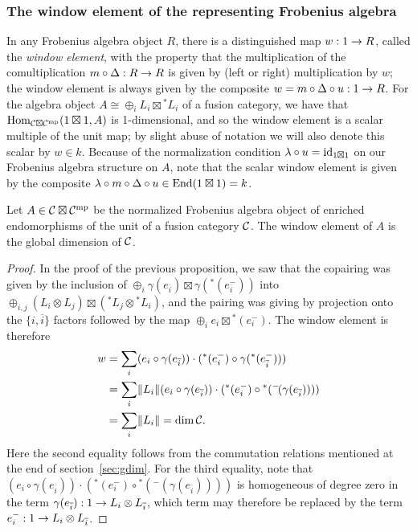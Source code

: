 \documentclass{amsart}
\begin{document}
\subsubsection{The window element of the representing Frobenius algebra}

In any Frobenius algebra object $R$, there is a distinguished map $w: 1 \rightarrow R$, called the \emph{window element}, with the property that the multiplication of the comultiplication $m \circ \Delta: R \rightarrow R$ is given by (left or right) multiplication by $w$; the window element is always given by the composite $w = m \circ \Delta \circ u: 1 \rightarrow R$.  For the algebra object $A \cong \oplus_i L_i \boxtimes {}^* L_i$ of a fusion category, we have that $\operatorname{Hom}_{\mathcal C \boxtimes \mathcal C^{\mathrm{mp}}}(1 \boxtimes 1, A)$ is 1-dimensional, and so the window element is a scalar multiple of the unit map; by slight abuse of notation we will also denote this scalar by $w \in k$.  Because of the normalization condition $\lambda \circ u = \mathrm{id}_{1 \boxtimes 1}$ on our Frobenius algebra structure on $A$, note that the scalar window element is given by the composite $\lambda \circ m \circ \Delta \circ u \in \operatorname{End}(1 \boxtimes 1) = k$.
\begin{proposition}
Let $A \in \mathcal C \boxtimes \mathcal C^{\mathrm{mp}}$ be the normalized Frobenius algebra object of enriched endomorphisms of the unit of a fusion category $\mathcal C$.  The window element of $A$ is the global dimension of $\mathcal C$.
\end{proposition}
\begin{proof}
In the proof of the previous proposition, we saw that the copairing was given by the inclusion of $\oplus_i \gamma(e_{\overline{i}}) \boxtimes \gamma({}^*(e_{\overline{i}}^{-}))$ into $\oplus_{i,j}  (L_i \otimes L_j) \boxtimes ({}^* L_j \otimes {}^* L_i)$, and the pairing was giving by projection onto the $\{i,\overline{i}\}$ factors followed by the map $\oplus_i e_i \boxtimes {}^*(e_i^{-})$.  The window element is therefore
\begin{align*}
w &= \sum_i (e_i \circ \gamma(e_{\overline{i}})) \cdot ({}^*(e_i^{-}) \circ \gamma({}^*(e_{\overline{i}}^{-}))) \\
&= \sum_i \lVert L_i \rVert (e_i \circ \gamma(e_{\overline{i}})) \cdot ({}^*(e_i^{-}) \circ {}^* ({}^-\!(\gamma(e_{\overline{i}})))) \\
&= \sum_i \lVert L_i \rVert = \dim \mathcal C.
\end{align*}
Here the second equality follows from the commutation relations mentioned at the end of section~\ref{sec:gdim}.  For the third equality, note that $(e_i \circ \gamma(e_{\overline{i}})) \cdot ({}^*(e_i^{-}) \circ {}^* ({}^-\!(\gamma(e_{\overline{i}}))))$ is homogeneous of degree zero in the term $\gamma(e_{\overline{i}}): 1 \rightarrow L_i \otimes L_{\overline{i}}$, which term may therefore be replaced by the term $e_i^{-}: 1 \rightarrow L_i \otimes L_{\overline{i}}$.
\end{proof}
\end{document}
